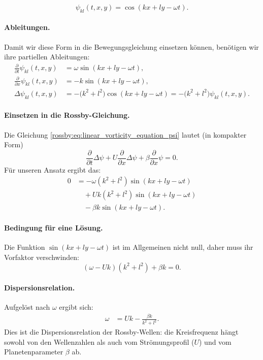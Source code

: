 \begin{equation}
	\psi_{kl}(t,x,y) = \cos(kx + ly - \omega t).
	\label{rossby:ebenewelle}
\end{equation}

\paragraph{Ableitungen.}
Damit wir diese Form in die Bewegungsgleichung einsetzen können,
benötigen wir ihre partiellen Ableitungen:
\begin{align*}
	\frac{\partial}{\partial t} \psi_{kl}(t,x,y)
	 & = \omega \sin(kx+ly-\omega t),
	\\[0.5em]
	\frac{\partial}{\partial x} \psi_{kl}(t,x,y)
	 & = -k \sin(kx+ly-\omega t),
	\\[0.5em]
	\Delta\psi_{kl}(t,x,y)
	 & = -\bigl(k^2+l^2\bigr)\cos(kx+ly-\omega t)
	= -\bigl(k^2+l^2\bigr)\psi_{kl}(t,x,y).
\end{align*}

\paragraph{Einsetzen in die Rossby-Gleichung.}
Die Gleichung  \eqref{rossby:eq:linear_vorticity_equation_psi} lautet (in kompakter Form)
\[
	\frac{\partial}{\partial t}\Delta \psi
	+ U \frac{\partial}{\partial x}\Delta \psi
	+ \beta \frac{\partial}{\partial x} \psi = 0.
\]
Für unseren Ansatz ergibt das:
\begin{align*}
	0
	 & = -\omega (k^2+l^2)\sin(kx+ly-\omega t)
	\\&\quad
	+ U k (k^2+l^2)\sin(kx+ly-\omega t)
	\\&\quad
	- \beta k \sin(kx+ly-\omega t).
\end{align*}

\paragraph{Bedingung für eine Lösung.}
Die Funktion $\sin(kx+ly-\omega t)$ ist im Allgemeinen nicht null,
daher muss ihr Vorfaktor verschwinden:
\[
	(\omega - Uk)(k^2+l^2) + \beta k = 0.
\]

\paragraph{Dispersionsrelation.}
Aufgelöst nach $\omega$ ergibt sich:
\begin{align}
	\omega
	 & = Uk - \frac{\beta k}{k^2+l^2}.
	\label{rossby:dispersion}
\end{align}
Dies ist die Dispersionsrelation der Rossby-Wellen:
die Kreisfrequenz hängt sowohl von den Wellenzahlen
als auch vom Strömungsprofil ($U$) und vom Planetenparameter $\beta$ ab.


